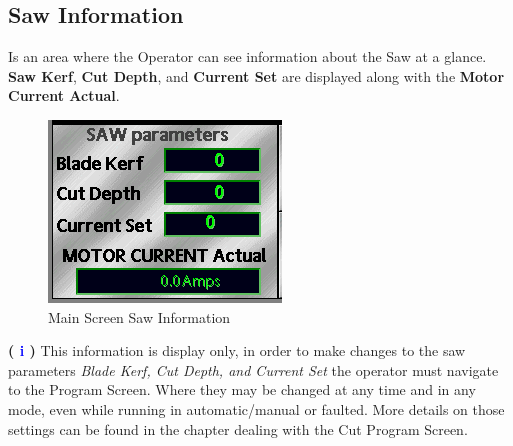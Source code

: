 \subsection{Saw Information}
Is an area where the Operator can see information about the Saw at a glance. \textbf{Saw Kerf}, \textbf{Cut Depth}, and \textbf{Current Set} are displayed along with the \textbf{Motor Current Actual}.
\begin{figure}
	\centering
	\includegraphics[width=.5\linewidth]{screen-captures/main/main-saw-info}
	\caption{Main Screen Saw Information}
	\label{fig:main-sawinfo}
\end{figure}
\textbf{\LARGE ( \textcolor{blue}{i} )} This information is display only, in order to make changes to the saw parameters \textit{Blade Kerf, Cut Depth, and Current Set} the operator must navigate to the Program Screen. Where they may be changed at any time and in any mode, even while running in automatic/manual or faulted. More details on those settings can be found in the chapter dealing with the Cut Program Screen.
\pagebreak
